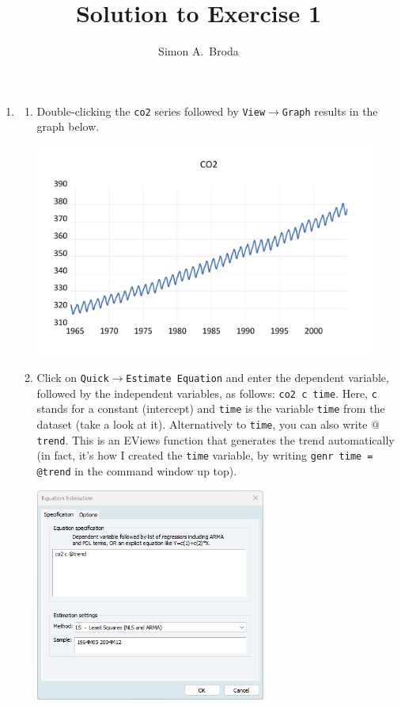 \documentclass[11pt, a4paper]{article}
\begin{document}
\title{Solution to Exercise 1}
\author{Simon A.\ Broda}
\date{}
\maketitle
\begin{enumerate}
\item 
\begin{enumerate}
\item  Double-clicking the \texttt{co2} series followed by \texttt{View$\rightarrow$Graph} results in the graph below.
\begin{center}
\includegraphics[height=7cm]{co2}
\end{center}
\item Click on \texttt{Quick$\rightarrow$Estimate Equation} and enter the dependent variable, followed by the independent variables, as follows: \texttt{co2 c time}. Here, \texttt{c} stands for a constant (intercept) and \texttt{time} is the variable \texttt{time} from the dataset (take a look at it). Alternatively to \texttt{time}, you can also write \texttt{$@$trend}. This is an EViews function that
generates the trend automatically (in fact, it's how I created the \texttt{time} variable, by writing \texttt{genr time = @trend} in the command window up top).
\begin{center}
\includegraphics[height=7cm]{linear1}

\end{center}
\end{enumerate}
\end{enumerate}
\end{document}
